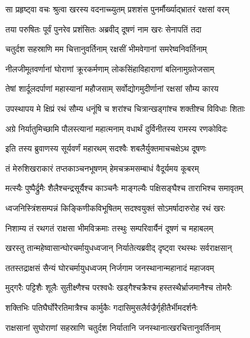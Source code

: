 \twolineshloka
{सा प्रहृष्ट्वा वचः श्रुत्वा खरस्य वदनाच्च्युतम्}
{प्रशशंस पुनर्मौर्ख्याद्भ्रातरं रक्षसां वरम्} %

\twolineshloka
{तया परुषितः पूर्वं पुनरेव प्रशंसितः}
{अब्रवीद् दूषणं नाम खरः सेनापतिं तदा} %

\twolineshloka
{चतुर्दश सहस्राणि मम चित्तानुवर्तिनाम्}
{रक्षसीं भीमवेगानां समरेष्वनिवर्तिनाम्} %

\twolineshloka
{नीलजीमूतवर्णानां घोराणां क्रूरकर्मणाम्}
{लोकसिंहाविहाराणां बलिनामुग्रतेजसाम्} %

\twolineshloka
{तेषां शार्दूलदर्पाणां महास्यानां महौजसाम्}
{सर्वोद्योगमुदीर्णानां रक्षसां सौम्य कारय} %

\twolineshloka
{उपस्थापय मे क्षिप्रं रथं सौम्य धनूंषि च}
{शरांश्च चित्रान्खड्गांश्च शक्तीश्च विविधाः शिताः} %

\twolineshloka
{अग्रे निर्यातुमिच्छामि पौलस्त्यानां महात्मनाम्}
{वधार्थं दुर्विनीतस्य रामस्य रणकोविदः} %

\twolineshloka
{इति तस्य ब्रुवाणस्य सूर्यवर्णं महारथम्}
{सदश्वैः शबलैर्युक्तमाचचक्षेऽथ दूषणः} %

\twolineshloka
{तं मेरुशिखराकारं तप्तकाञ्चनभूषणम्}
{हेमचक्रमसम्बाधं वैदूर्यमय कूबरम्} %

\twolineshloka
{मत्स्यैः पुष्पैर्द्रुमैः शैलैश्चन्द्रसूर्यैश्च काञ्चनैः}
{माङ्गल्यैः पक्षिसङ्घैश्च ताराभिश्च समावृतम्} %

\twolineshloka
{ध्वजनिस्त्रिंशसम्पन्नं किङ्किणीकविभूषितम्}
{सदश्वयुक्तं सोऽमर्षादारुरोह रथं खरः} %

\twolineshloka
{निशाम्य तं रथगतं राक्षसा भीमविक्रमाः}
{तस्थुः सम्परिवार्यैनं दूषणं च महाबलम्} %

\twolineshloka
{खरस्तु तान्महेष्वासान्घोरचर्मायुधध्वजान्}
{निर्यातेत्यब्रवीद् दृष्ट्वा रथस्थः सर्वराक्षसान्} %

\twolineshloka
{ततस्तद्राक्षसं सैन्यं घोरचर्मायुधध्वजम्}
{निर्जगाम जनस्थानान्महानादं महाजवम्} %

\twolineshloka
{मुद्गरैः पट्टिशैः शूलैः सुतीक्ष्णैश्च परश्वधैः}
{खड्गैश्चक्रैश्च हस्तस्थैर्भ्राजमानैश्च तोमरैः} %

\twolineshloka
{शक्तिभिः पतिघैर्घोरैरतिमात्रैश्च कार्मुकैः}
{गदासिमुसलैर्वज्रैर्गृहीतैर्भीमदर्शनैः} %

\twolineshloka
{राक्षसानां सुघोराणां सहस्राणि चतुर्दश}
{निर्यातानि जनस्थानात्खरचित्तानुवर्तिनाम्} %

